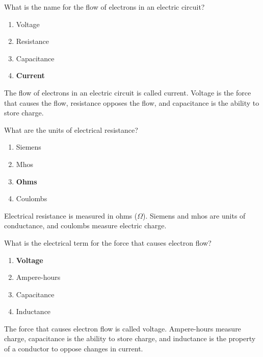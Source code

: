 
\begin{tcolorbox}[colback=gray!10!white,colframe=black!75!black,title={T5A03}]
What is the name for the flow of electrons in an electric circuit?
\begin{enumerate}[label=\Alph*,noitemsep]
    \item Voltage
    \item Resistance
    \item Capacitance
    \item \textbf{Current}
\end{enumerate}
\end{tcolorbox}
The flow of electrons in an electric circuit is called current. Voltage is the force that causes the flow, resistance opposes the flow, and capacitance is the ability to store charge.


\begin{tcolorbox}[colback=gray!10!white,colframe=black!75!black,title={T5A04}]
What are the units of electrical resistance?
\begin{enumerate}[label=\Alph*,noitemsep]
    \item Siemens
    \item Mhos
    \item \textbf{Ohms}
    \item Coulombs
\end{enumerate}
\end{tcolorbox}
Electrical resistance is measured in ohms (\(\Omega\)). Siemens and mhos are units of conductance, and coulombs measure electric charge.


\begin{tcolorbox}[colback=gray!10!white,colframe=black!75!black,title={T5A05}]
What is the electrical term for the force that causes electron flow?
\begin{enumerate}[label=\Alph*,noitemsep]
    \item \textbf{Voltage}
    \item Ampere-hours
    \item Capacitance
    \item Inductance
\end{enumerate}
\end{tcolorbox}
The force that causes electron flow is called voltage. Ampere-hours measure charge, capacitance is the ability to store charge, and inductance is the property of a conductor to oppose changes in current.

